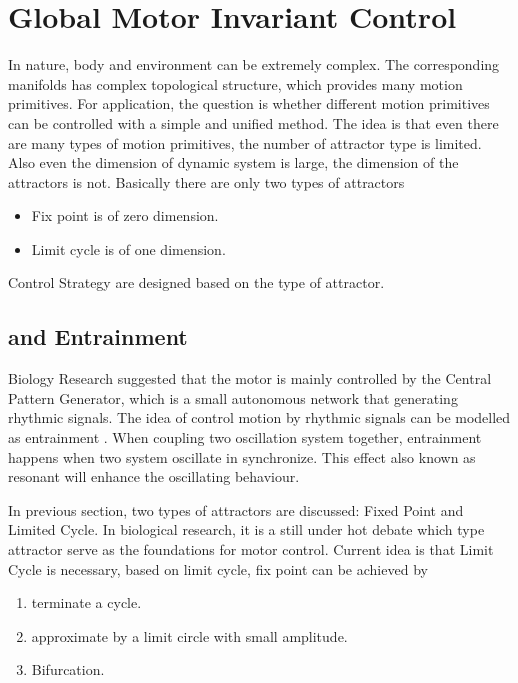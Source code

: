 \section{Global Motor Invariant Control}

In nature, body and environment can be extremely complex. 
The corresponding manifolds has complex topological structure, which provides many motion primitives.
For \cms application, the question is whether different motion primitives can be controlled with a simple and unified method.
The idea is that even there are many types of motion primitives, the number of attractor type is limited. 
Also even the dimension of dynamic system is large, the dimension of the attractors is not. 
Basically there are only two types of attractors
\begin{itemize}
\item Fix point is of zero dimension. 
\item Limit cycle is of one dimension.
\end{itemize}

Control Strategy are designed based on the type of attractor.


\subsection{\cpg and Entrainment}
Biology Research suggested that the motor is mainly controlled by the Central Pattern Generator, which is a small autonomous network that generating rhythmic signals.
The idea of control motion by rhythmic signals can be modelled as entrainment \citep{Gonz'alez-Miranda2004}.
When coupling two oscillation system together, entrainment happens when two system oscillate in synchronize. 
This effect also known as resonant will enhance the oscillating behaviour. 




In previous section, two types of attractors are discussed: Fixed Point and Limited Cycle. 
In biological research, it is a still under hot debate which type attractor serve as the foundations for motor control\citep{Degallier2010}.
Current idea is that Limit Cycle is necessary, based on limit cycle, fix point can be achieved by
\begin{enumerate} 
\item terminate a cycle. 
\item approximate by a limit circle with small amplitude.
\item Bifurcation. 
\end{enumerate}


